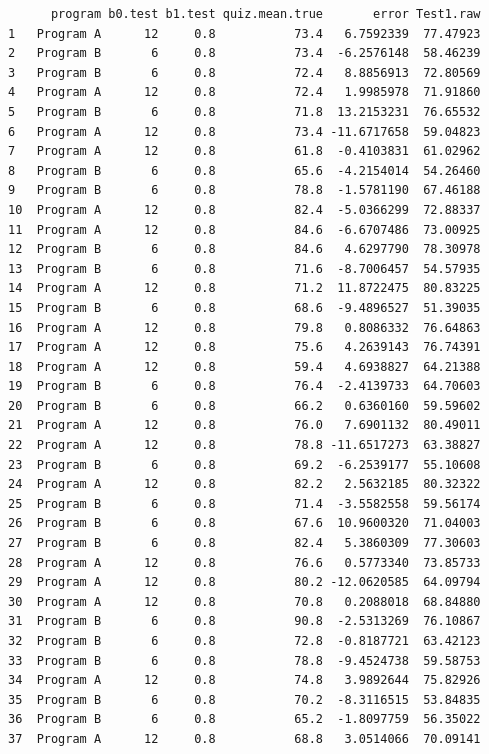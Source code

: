 \documentclass[
  letterpaper,
  DIV=11,
  numbers=noendperiod]{scrreprt}
\begin{document}
\begin{verbatim}
      program b0.test b1.test quiz.mean.true       error Test1.raw
1   Program A      12     0.8           73.4   6.7592339  77.47923
2   Program B       6     0.8           73.4  -6.2576148  58.46239
3   Program B       6     0.8           72.4   8.8856913  72.80569
4   Program A      12     0.8           72.4   1.9985978  71.91860
5   Program B       6     0.8           71.8  13.2153231  76.65532
6   Program A      12     0.8           73.4 -11.6717658  59.04823
7   Program A      12     0.8           61.8  -0.4103831  61.02962
8   Program B       6     0.8           65.6  -4.2154014  54.26460
9   Program B       6     0.8           78.8  -1.5781190  67.46188
10  Program A      12     0.8           82.4  -5.0366299  72.88337
11  Program A      12     0.8           84.6  -6.6707486  73.00925
12  Program B       6     0.8           84.6   4.6297790  78.30978
13  Program B       6     0.8           71.6  -8.7006457  54.57935
14  Program A      12     0.8           71.2  11.8722475  80.83225
15  Program B       6     0.8           68.6  -9.4896527  51.39035
16  Program A      12     0.8           79.8   0.8086332  76.64863
17  Program A      12     0.8           75.6   4.2639143  76.74391
18  Program A      12     0.8           59.4   4.6938827  64.21388
19  Program B       6     0.8           76.4  -2.4139733  64.70603
20  Program B       6     0.8           66.2   0.6360160  59.59602
21  Program A      12     0.8           76.0   7.6901132  80.49011
22  Program A      12     0.8           78.8 -11.6517273  63.38827
23  Program B       6     0.8           69.2  -6.2539177  55.10608
24  Program A      12     0.8           82.2   2.5632185  80.32322
25  Program B       6     0.8           71.4  -3.5582558  59.56174
26  Program B       6     0.8           67.6  10.9600320  71.04003
27  Program B       6     0.8           82.4   5.3860309  77.30603
28  Program A      12     0.8           76.6   0.5773340  73.85733
29  Program A      12     0.8           80.2 -12.0620585  64.09794
30  Program A      12     0.8           70.8   0.2088018  68.84880
31  Program B       6     0.8           90.8  -2.5313269  76.10867
32  Program B       6     0.8           72.8  -0.8187721  63.42123
33  Program B       6     0.8           78.8  -9.4524738  59.58753
34  Program A      12     0.8           74.8   3.9892644  75.82926
35  Program B       6     0.8           70.2  -8.3116515  53.84835
36  Program B       6     0.8           65.2  -1.8097759  56.35022
37  Program A      12     0.8           68.8   3.0514066  70.09141

\end{verbatim}
\end{document}
